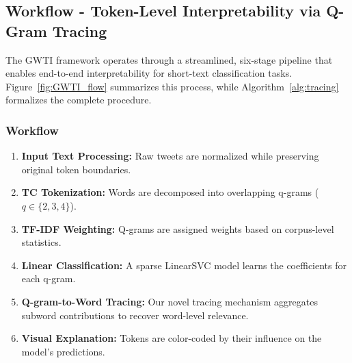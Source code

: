 \documentclass[runningheads,10pt]{llncs}
\begin{document}

\subsection{Workflow - Token-Level Interpretability via Q-Gram Tracing}

The GWTI framework operates through a streamlined, six-stage pipeline that enables end-to-end interpretability for short-text classification tasks. Figure~\ref{fig:GWTI_flow} summarizes this process, while Algorithm~\ref{alg:tracing} formalizes the complete procedure.

\subsubsection{Workflow}

\begin{enumerate}
    \item \textbf{Input Text Processing:} Raw tweets are normalized while preserving original token boundaries.
    \item \textbf{\textmu TC Tokenization:} Words are decomposed into overlapping q-grams ($q \in \{2, 3, 4\}$).
    \item \textbf{TF-IDF Weighting:} Q-grams are assigned weights based on corpus-level statistics.
    \item \textbf{Linear Classification:} A sparse LinearSVC model learns the coefficients for each q-gram.
    \item \textbf{Q-gram-to-Word Tracing:} Our novel tracing mechanism aggregates subword contributions to recover word-level relevance.
    \item \textbf{Visual Explanation:} Tokens are color-coded by their influence on the model’s predictions.
\end{enumerate}
\end{document}

